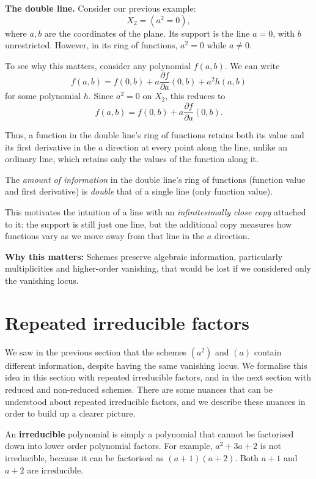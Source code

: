 \documentclass[12pt]{article}
\begin{document}
\textbf{The double line.}
Consider our previous example:
\[
X_2=(a^2=0),
\]
where $a,b$ are the coordinates of the plane.
Its support is the line $a=0$,
with $b$ unrestricted. However, in its ring of
functions, $a^2=0$ while $a\neq 0$.

To see why this matters, consider any polynomial $f(a,b)$.
We can write
\[
f(a,b)=f(0,b)+a\frac{\partial f}{\partial a}(0,b)
       +a^2h(a,b)
\]
for some polynomial $h$. Since $a^2=0$ on $X_2$,
this reduces to
\[
f(a,b)=f(0,b)+a\frac{\partial f}{\partial a}(0,b).
\]


Thus, a function in the double line's ring of functions retains both its value and its first derivative in
the $a$ direction at every point along the line, unlike
an ordinary line, which retains only the values of the
function along it.

The \emph{amount of information} in the double line's ring of functions (function value and first derivative) is \emph{double} that of a single line (only function value).

This motivates the intuition of a line with an
\emph{infinitesimally close copy} attached to it:
the support is still just one line, but
the additional copy measures how functions vary
as we move away from that line in the $a$ direction.

\textbf{Why this matters:} Schemes preserve algebraic
information, particularly multiplicities and higher-order
vanishing, that would be lost if we considered only the
vanishing locus.

\newpage
\section{Repeated irreducible factors}\label{Repeated irreducible factors}

We saw in the previous section that the schemes $(a^2)$ and $(a)$ contain different information, despite having the same vanishing locus. We formalise this idea in this section with repeated irreducible factors, and in the next section with reduced and non-reduced schemes. There are some nuances that can be understood about repeated irreducible factors, and we describe these nuances in order to build up a clearer picture.

An \textbf{irreducible} polynomial is simply a polynomial that cannot be factorised down into lower order polynomial factors. For example, $a^2 + 3a + 2$ is not irreducible, because it can be factorised as $(a+1)(a+2)$. Both $a+1$ and $a+2$ are irreducible.
\end{document}

